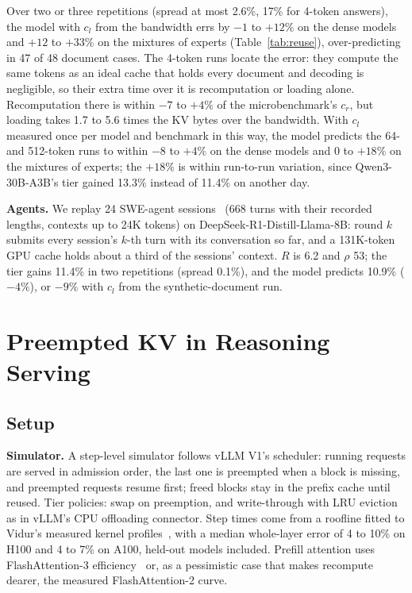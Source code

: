 \documentclass[journal]{IEEEtran}
\begin{document}
Over two or three repetitions (spread at most 2.6\%, 17\% for 4-token answers), the model with
$c_l$ from the bandwidth errs by $-1$ to $+12\%$ on the dense models and $+12$ to $+33\%$ on the
mixtures of experts (Table~\ref{tab:reuse}), over-predicting in 47 of 48 document cases. The 4-token runs locate the error: they
compute the same tokens as an ideal cache that holds every document and decoding is negligible, so
their extra time over it is recomputation or loading alone. Recomputation there is within $-7$
to $+4\%$ of the microbenchmark's $c_r$, but loading takes 1.7 to 5.6 times the KV bytes over the bandwidth. With
$c_l$ measured once per model and benchmark in this way, the model predicts the 64- and 512-token
runs to within $-8$ to $+4\%$ on the dense models and 0 to $+18\%$ on the mixtures of experts; the
$+18\%$ is within run-to-run variation, since Qwen3-30B-A3B's tier gained 13.3\% instead of 11.4\% on another day.

\textbf{Agents.} We replay 24 SWE-agent sessions~\cite{sweagent_traj} (668 turns with their
recorded lengths, contexts up to 24K tokens) on DeepSeek-R1-Distill-Llama-8B: round $k$ submits every
session's $k$-th turn with its conversation so far, and a 131K-token GPU cache holds about a third of
the sessions' context. $R$ is 6.2 and $\rho$ 53; the tier gains 11.4\% in two repetitions (spread
0.1\%), and the model predicts 10.9\% ($-4\%$), or $-9\%$ with $c_l$ from the synthetic-document run.

\begin{table}[t]
\centering
\caption{Real vLLM: gain of the CPU tier over recomputation for answers of 4, 64 and 512 tokens
(range over both benchmarks), and the model's error (predicted over measured gain, minus 1) with
$c_l$ from the link bandwidth (all answers) or from the 4-token run (64 and 512 tokens). Upper
rows: RTX 4500 Ada; lower rows: A100 (QwQ 32B on two); last row: agent sessions.}
\label{tab:reuse}
\footnotesize
\setlength{\tabcolsep}{4pt}

\end{table}

\section{Preempted KV in Reasoning Serving}
\label{sec:preempt}
\subsection{Setup}
\textbf{Simulator.} A step-level simulator follows vLLM V1's scheduler: running requests are served
in admission order, the last one is preempted when a block is missing, and preempted requests resume
first; freed blocks stay in the prefix cache until reused. Tier policies: swap on preemption, and
write-through with LRU eviction as in vLLM's CPU offloading connector. Step times come from a
roofline fitted to Vidur's measured kernel profiles~\cite{vidur}, with a median whole-layer error
of 4 to 10\% on H100 and 4 to 7\% on A100, held-out models included. Prefill attention uses FlashAttention-3
efficiency~\cite{fa3} or, as a pessimistic case that makes recompute dearer, the measured
FlashAttention-2 curve.
\end{document}
